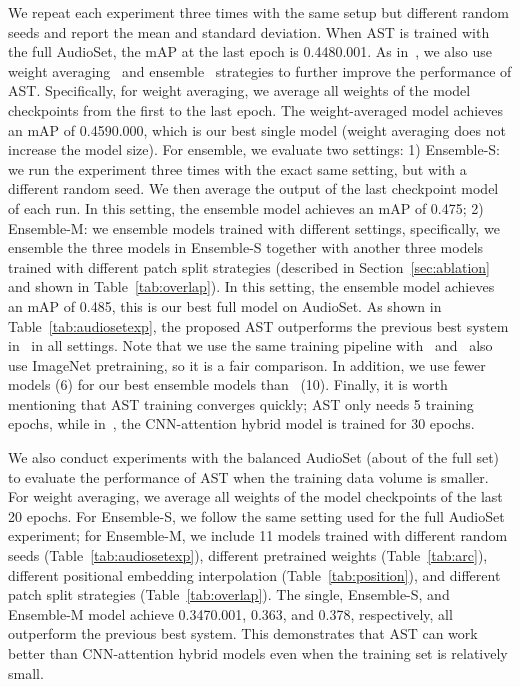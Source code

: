 \documentclass[a4paper]{article}
\begin{document}
We repeat each experiment three times with the same setup but different random seeds and report the mean and standard deviation. When AST is trained with the full AudioSet, the mAP at the last epoch is 0.4480.001. As in~\cite{gong2021psla}, we also use weight averaging~\cite{izmailov2018averaging} and ensemble~\cite{breiman1996bagging} strategies to further improve the performance of AST. Specifically, for weight averaging, we average all weights of the model checkpoints from the first to the last epoch. The weight-averaged model achieves an mAP of 0.4590.000, which is our best single model (weight averaging does not increase the model size). For ensemble, we evaluate two settings: 1) Ensemble-S: we run the experiment three times with the exact same setting, but with a different random seed. We then average the output of the last checkpoint model of each run. In this setting, the ensemble model achieves an mAP of 0.475; 2) Ensemble-M: we ensemble models trained with different settings, specifically, we ensemble the three models in Ensemble-S together with another three models trained with different patch split strategies (described in Section~\ref{sec:ablation} and shown in Table~\ref{tab:overlap}). In this setting, the ensemble model achieves an mAP of 0.485, this is our best full model on AudioSet. As shown in Table~\ref{tab:audiosetexp}, the proposed AST outperforms the previous best system in~\cite{gong2021psla} in all settings. Note that we use the same training pipeline with~\cite{gong2021psla} and~\cite{gong2021psla} also use ImageNet pretraining, so it is a fair comparison. In addition, we use fewer models (6) for our best ensemble models than~\cite{gong2021psla} (10). Finally, it is worth mentioning that AST training converges quickly; AST only needs 5 training epochs, while in~\cite{gong2021psla}, the CNN-attention hybrid model is trained for 30 epochs.

We also conduct experiments with the balanced AudioSet (about  of the full set) to evaluate the performance of AST when the training data volume is smaller. For weight averaging, we average all weights of the model checkpoints of the last 20 epochs. For Ensemble-S, we follow the same setting used for the full AudioSet experiment; for Ensemble-M, we include 11 models trained with different random seeds (Table~\ref{tab:audiosetexp}), different pretrained weights (Table~\ref{tab:arc}), different positional embedding interpolation (Table~\ref{tab:position}), and different patch split strategies (Table~\ref{tab:overlap}). The single, Ensemble-S, and Ensemble-M model achieve 0.3470.001, 0.363, and 0.378, respectively, all outperform the previous best system. This demonstrates that AST can work better than CNN-attention hybrid models even when the training set is relatively small.
\end{document}
